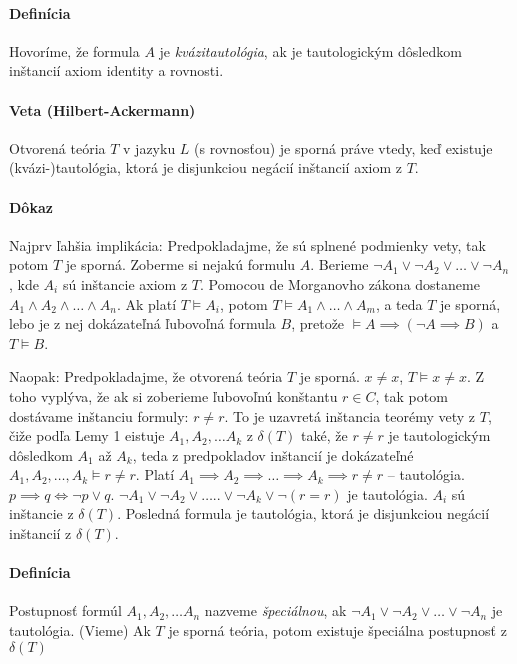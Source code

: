\paragraph{Definícia} Hovoríme, že formula $A$ je \emph{kvázitautológia}, ak je
tautologickým dôsledkom inštancií axiom identity a rovnosti.

\paragraph{Veta (Hilbert-Ackermann)} Otvorená teória $T$ v jazyku $L$ (s
rovnosťou) je sporná práve vtedy, keď existuje (kvázi-)tautológia, ktorá je
disjunkciou negácií inštancií axiom z $T$.

\paragraph{Dôkaz} Najprv ľahšia implikácia: Predpokladajme, že sú splnené
podmienky vety, tak potom $T$ je sporná. Zoberme si nejakú formulu $A$. Berieme
$\neg A_1 \lor \neg A_2 \lor \ldots \lor \neg A_n$, kde $A_i$ sú inštancie axiom
z $T$. Pomocou de Morganovho zákona dostaneme $A_1 \land A_2 \land \ldots \land
A_n$. Ak platí $T \models A_i$, potom $T \models A_1 \land \ldots \land A_m$, a
teda $T$ je sporná, lebo je z nej dokázateľná ľubovoľná formula $B$, pretože
$\models A \implies (\neg A \implies B)$ a $T \models B$.

\par Naopak: Predpokladajme, že otvorená teória $T$ je sporná. $x \neq x$, $T
\models x \neq x$. Z toho vyplýva, že ak si zoberieme ľubovoľnú konštantu $r \in
C$, tak potom dostávame inštanciu formuly: $r \neq r$. To je uzavretá inštancia
teorémy vety z $T$, čiže podľa  Lemy 1 eistuje $A_1, A_2, \ldots A_k$  z $\delta
(T)$ také, že $r \neq r$ je tautologickým dôsledkom $A_1$ až $A_k$, teda z
predpokladov inštancií je dokázateľné $A_1, A_2, \ldots, A_k \models r \neq r$.
Platí $A_1 \implies A_2 \implies \ldots \implies A_k \implies r \neq r$ --
tautológia. $p \implies q \iff \neg p \lor q$. $\neg A_1 \lor \neg A_2 \lor
\ldots .. \lor \neg A_k \lor \neg (r=r)$ je tautológia. $A_i$ sú inštancie z
$\delta (T)$. Posledná formula je tautológia, ktorá je disjunkciou negácií
inštancií z $\delta (T)$.

\paragraph{Definícia} Postupnosť formúl $A_1, A_2, \ldots A_n$ nazveme
\emph{špeciálnou}, ak $\neg A_1\lor \neg A_2 \lor \ldots \lor \neg A_n$ je
tautológia. (Vieme) Ak $T$ je sporná teória, potom existuje špeciálna postupnosť
z $\delta (T)$



